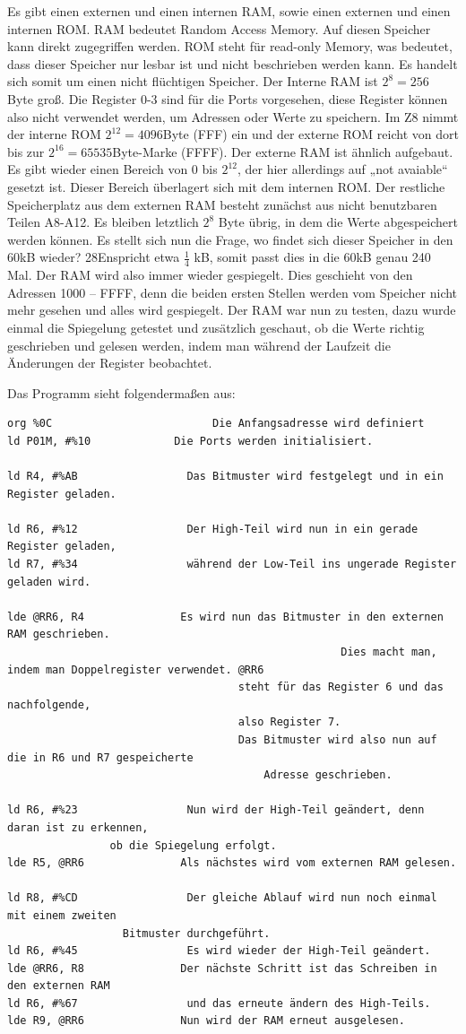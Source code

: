 Es gibt einen externen und einen internen RAM, sowie einen externen und einen internen ROM.
RAM bedeutet Random Access Memory. Auf diesen Speicher kann direkt zugegriffen werden.
ROM steht für read-only Memory, was bedeutet, dass dieser Speicher nur lesbar ist und nicht beschrieben werden kann. Es handelt sich somit um einen nicht flüchtigen Speicher.
Der Interne RAM ist $2^8=256$ Byte groß. Die Register 0-3 sind für die Ports vorgesehen, diese Register können also nicht verwendet werden, um Adressen oder Werte zu speichern.
Im Z8 nimmt der interne ROM $2^{12}=4096$Byte (FFF) ein und der externe ROM reicht von dort bis zur $2^16=65535$Byte-Marke (FFFF). Der externe RAM ist ähnlich aufgebaut. Es gibt wieder einen Bereich von $0$ bis $2^{12}$, der hier allerdings auf „not avaiable“ gesetzt ist. Dieser Bereich überlagert sich mit dem internen ROM. Der restliche Speicherplatz aus dem externen RAM besteht zunächst aus nicht benutzbaren Teilen A8-A12. Es bleiben letztlich $2^8$ Byte übrig, in dem die Werte abgespeichert werden können. Es stellt sich nun die Frage, wo findet sich dieser Speicher in den 60kB wieder? 28Enspricht etwa $\frac{1}{4}$ kB, somit passt dies in die 60kB genau 240 Mal. Der RAM wird also immer wieder gespiegelt. Dies geschieht von den Adressen 1000 – FFFF, denn die beiden  ersten Stellen werden vom  Speicher nicht mehr gesehen und alles wird gespiegelt.
Der RAM war nun zu testen, dazu wurde einmal die Spiegelung getestet und zusätzlich geschaut, ob die Werte richtig geschrieben und gelesen werden, indem man während der Laufzeit die Änderungen der Register beobachtet.

Das Programm sieht folgendermaßen aus:
\begin{verbatim}
org %0C					        Die Anfangsadresse wird definiert
ld P01M, #%10			  Die Ports werden initialisiert.

ld R4, #%AB				    Das Bitmuster wird festgelegt und in ein Register geladen.

ld R6, #%12				    Der High-Teil wird nun in ein gerade Register geladen,
ld R7, #%34				    während der Low-Teil ins ungerade Register geladen wird.

lde @RR6, R4			   Es wird nun das Bitmuster in den externen RAM geschrieben. 
									                Dies macht man, indem man Doppelregister verwendet. @RR6 
					                steht für das Register 6 und das nachfolgende, 
					                also Register 7. 							
					                Das Bitmuster wird also nun auf die in R6 und R7 gespeicherte 		
						                Adresse geschrieben.

ld R6, #%23				    Nun wird der High-Teil geändert, denn daran ist zu erkennen, 
                ob die Spiegelung erfolgt.
lde R5, @RR6			   Als nächstes wird vom externen RAM gelesen.

ld R8, #%CD				    Der gleiche Ablauf wird nun noch einmal mit einem zweiten
 	              Bitmuster durchgeführt.
ld R6, #%45				    Es wird wieder der High-Teil geändert.
lde @RR6, R8			   Der nächste Schritt ist das Schreiben in den externen RAM
ld R6, #%67				    und das erneute ändern des High-Teils.
lde R9, @RR6			   Nun wird der RAM erneut ausgelesen.
\end{verbatim}

